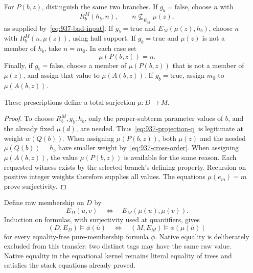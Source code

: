 For \(P(b,z)\), distinguish the same two branches.
If \(g_b=\mathrm{false}\), choose \(n\) with
\[
 R_b^M(h_b,n),\qquad n\not\subseteq_{E_M}\mu(z),
\]
as supplied by~\eqref{eq:937-bad-input}.
If \(g_b=\mathrm{true}\) and \(E_M(\mu(z),h_b)\), choose \(n\)
with \(R_b^M(n,\mu(z))\), using hull support.
If \(g_b=\mathrm{true}\) and \(\mu(z)\) is not a member of \(h_b\),
take \(n=m_0\).  In each case set
\begin{equation}
                         \mu(P(b,z))=n.
                         \label{eq:937-projection-p}
\end{equation}
Finally, if \(g_b=\mathrm{false}\), choose a member of
\(\mu(P(b,z))\) that is not a member of \(\mu(z)\), and assign
that value to \(\mu(A(b,z))\).  If \(g_b=\mathrm{true}\),
assign \(m_0\) to \(\mu(A(b,z))\).

\begin{lemma}
\label{lem:937-projection}
These prescriptions define a total surjection \(\mu:D\to M\).
\end{lemma}

\begin{proof}
To choose \(R_b^M,g_b,h_b\), only the proper-subterm parameter
values of \(b\), and the already fixed \(\mu(d)\), are needed.
Thus~\eqref{eq:937-projection-q} is legitimate at weight \(w(Q(b))\).
When assigning \(\mu(P(b,z))\), both \(\mu(z)\) and the needed
\(\mu(Q(b))=h_b\) have smaller weight by~\eqref{eq:937-cross-order}.
When assigning \(\mu(A(b,z))\), the value \(\mu(P(b,z))\) is
available for the same reason.  Each requested witness exists by
the selected branch's defining property.  Recursion on positive
integer weights therefore supplies all values.  The equations
\(\mu(e_m)=m\) prove surjectivity.
\end{proof}

Define raw membership on \(D\) by
\[
                      E_D(u,v)\quad\Longleftrightarrow\quad
                      E_M(\mu(u),\mu(v)).
\]
Induction on formulas, with surjectivity used at quantifiers, gives
\begin{equation}
 (D,E_D)\models\phi(\bar u)
       \quad\Longleftrightarrow\quad
 (M,E_M)\models\phi(\mu(\bar u))
 \label{eq:937-formula-transfer}
\end{equation}
for every equality-free pure-membership formula \(\phi\).
Native equality is deliberately excluded from this transfer:
two distinct tags may have the same raw value.
Native equality in the equational kernel remains literal equality
of trees and satisfies the stack equations already proved.

